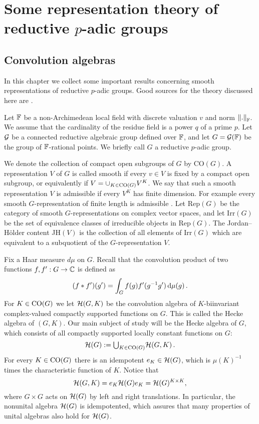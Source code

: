 \chapter{Some representation theory of reductive $p$-adic groups}


\section{Convolution algebras}
\label{sec:2.1}


In this chapter we collect some important results concerning
smooth representations of reductive $p$-adic groups. Good sources
for the theory discussed here are
\cite{BeDe,Car,Sil2,SSZ,Tits,Wal}.

Let $\mathbb F$ be a non-Archimedean local field with discrete valuation $v$ 
and norm $\left\| . \right\|_{\mathbb F}$. We assume that the cardinality of the residue 
field is a power $q$ of a prime $p$. Let $\mathcal G$ be a connected reductive algebraic 
group defined over $\mathbb F$, and let $G = \mathcal G (\mathbb F )$ be the group of 
$\mathbb F$-rational points. We briefly call $G$ a reductive $p$-adic group.

We denote the collection of compact open subgroups of $G$ by
CO$(G)$. A representation $V$ of $G$ is called smooth if every $v
\in V$ is fixed by a compact open subgroup, or equivalently if $V
= \cup_{K \in \mathrm{CO}(G)} V^K$. We say that such a smooth representation $V$ 
is admissible if every $V^K$ has finite dimension. For example every smooth 
$G$-representation of finite length is admissible \cite[3.12]{BeDe}.
Let Rep$ (G)$ be the category of
smooth $G$-representations on complex vector spaces, and let Irr$ (G)$ be 
the set of equivalence classes of irreducible objects in Rep$ (G)$.
The Jordan--H\"older content JH$ (V)$ is the collection of all elements of Irr$ (G)$
which are equivalent to a subquotient of the $G$-representation $V$.

Fix a Haar measure $d\mu$ on $G$. Recall that the convolution
product of two functions $f,f' : G \to \mathbb C$ is defined as
\[
(f * f')(g') = \int_G f(g) f'(g^{-1} g') \, \textup{d}\mu (g) \,.
\]
For $K \in \mathrm{CO}(G)$ we let $\mathcal H (G,K)$ be the convolution
algebra of $K$-biinvariant complex-valued compactly supported
functions on $G$. This is called the Hecke algebra of $(G,K)$. Our
main subject of study will be the Hecke algebra of $G$, which
consists of all compactly supported locally constant functions on $G$:
\begin{equation}
\mathcal H (G) := {\textstyle \bigcup_{K \in \mathrm{CO}(G)} } \mathcal H (G,K) \,.
\end{equation}
For every $K \in \mathrm{CO}(G)$ there is an idempotent $e_K \in \mathcal H
(G)$, which is $\mu (K)^{-1}$ times the characteristic function of
$K$. Notice that
\begin{equation}
\mathcal H (G,K) = e_K \mathcal H (G) e_K = \mathcal H (G)^{K \times K} ,
\end{equation}
where $G \times G$ acts on $\mathcal H (G)$ by left and right
translations. In particular, the nonunital algebra $\mathcal H (G)$ is
idempotented, which assures that many properties of unital
algebras also hold for $\mathcal H (G)$.

